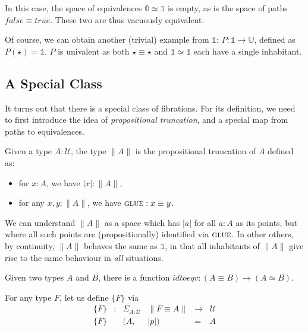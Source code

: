 \documentclass{entcs}
\newcommand{\gluep}{\textsc{glue}}
\newcommand{\fc}{\mathit{false}}
\newcommand{\tc}{\mathit{true}}
\newcommand{\bracket}[1]{\ensuremath{\{#1\}}}
\newcommand{\ptrunc}[1]{\ensuremath{\| #1 \|}}
\begin{document}
\medskip\noindent In this case, the space of equivalences
$\mathbb{0} \simeq \mathbb{1}$ is empty, as is the space of
paths $\fc \equiv \tc$. These two are thus vacuously equivalent.

Of course, we can obtain another (trivial) example from $\mathbb{1}$:
$P : \mathbb{1} \rightarrow \mathbb{U}$, defined as
$P(\star) = \mathbb{1}$. $P$ is univalent as both $\star \equiv \star$ and
$\mathbb{1} \simeq \mathbb{1}$ each have a single inhabitant.

\subsection{A Special Class}

It turns out that there is a special class of fibrations.  For its
definition, we need to first introduce the idea of
\emph{propositional truncation}, and a special map from
paths to equivalences.

\begin{defn}
Given a type $A : \mathcal{U}$, the type
$\ptrunc{A}$ is the propositional truncation of $A$ defined as: 
\begin{itemize}
\item for $x : A$, we have $|x| : \ptrunc{A}$,
\item for any $x,y : \ptrunc{A}$, we have $\gluep : x \equiv y$.
\end{itemize}
\end{defn}
\noindent We can understand $\ptrunc{A}$ as a space which has
$|a|$ for all $a : A$ as its points, but where all such points are
(propositionally) identified via $\gluep$.  In other others,
by continuity, $\ptrunc{A}$ behaves the same as $\mathbb{1}$,
in that all inhabitants of $\ptrunc{A}$ give rise to the same
behaviour in \emph{all} situations.

\begin{defn}
Given two types $A$ and $B$, there is a function
$\mathit{idtoeqv} : (A \equiv B) \to (A \simeq B)$.
\end{defn}

For any type $F$, let us define $\bracket{F}$ via
\[\begin{array}{rcllcl}
\bracket{F} &:& \Sigma_{A:\mathcal{U}} & \ptrunc{F \equiv A} & \rightarrow & \mathcal{U} \\
\bracket{F} & & (A, & |p|) &=& A
\end{array}\]

\newpage
\end{document}
